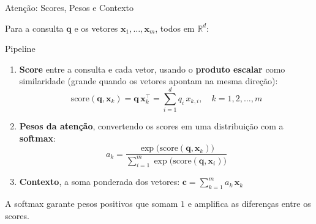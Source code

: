 \documentclass[aspectratio=169,xcolor=dvipsnames]{beamer}
\begin{document}
\begin{frame}[shrink=10]{Atenção: Scores, Pesos e Contexto}

Para a consulta $\mathbf{q}$ e os vetores $\mathbf{x}_1, \dots, \mathbf{x}_m$, todos em $\mathbb{R}^d$:

\begin{block}{Pipeline}
\begin{enumerate}
    \item \textbf{Score} entre a consulta e cada vetor, usando o \textbf{produto escalar} como similaridade (grande quando os vetores apontam na mesma direção):
    \[
        \mathrm{score}(\mathbf{q}, \mathbf{x}_k) = \mathbf{q}\,\mathbf{x}_k^{\top} = \sum_{i=1}^{d} q_i \, x_{k,i}, \quad k = 1, 2, \dots, m
    \]
    \item \textbf{Pesos da atenção}, convertendo os scores em uma distribuição com a \textbf{softmax}:
    \[
        a_k = \frac{\exp\bigl(\mathrm{score}(\mathbf{q}, \mathbf{x}_k)\bigr)}{\sum_{i=1}^{m} \exp\bigl(\mathrm{score}(\mathbf{q}, \mathbf{x}_i)\bigr)}
    \]
    \item \textbf{Contexto}, a soma ponderada dos vetores:
    $\displaystyle \mathbf{c} = \sum_{k=1}^{m} a_k \, \mathbf{x}_k$
\end{enumerate}
\end{block}

\vspace{2pt}

A softmax garante pesos positivos que somam $1$ e amplifica as diferenças entre os scores.

\end{frame}

\end{document}
